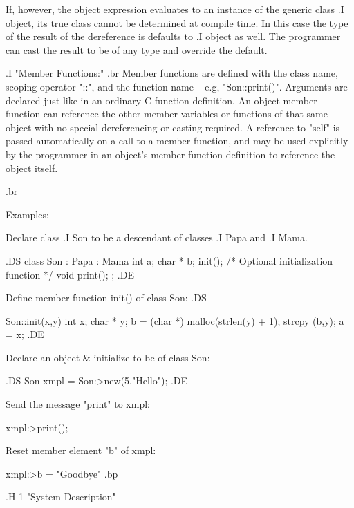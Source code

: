 If, however, the object expression evaluates to an instance of the
generic class
.I object,
its true class cannot be determined at compile time.  In this
case the type of the result of the dereference is defaults to
.I object
as well.  The programmer can cast the result to be of
any type and override the default.

.I "Member Functions:"
.br
Member functions are defined with the class name, scoping operator "::", and the
function name -- e.g, "Son::print()".   Arguments are declared just like in
an ordinary C function definition.  An object member function can reference
the other
member variables or functions
of that same object with no special dereferencing or casting
required.  A reference to "self" is passed automatically on a call to a
member function, and may be used explicitly by the programmer
in an object's member function definition to
reference the object itself.


.br

Examples:

Declare class
.I Son
to be a descendant of classes
.I Papa
and
.I Mama.

.DS
	class Son : Papa : Mama
		{ int a;
		  char * b;
		  init();	/* Optional initialization function */
		  void print();
		};
.DE

Define member function init() of class Son:
.DS

	Son::init(x,y)	int x; char * y;
	{ b = (char *) malloc(strlen(y) + 1);
	  strcpy (b,y);
	  a = x;
	}
.DE

Declare an object & initialize to be of class Son:

.DS
	Son xmpl = Son:>new(5,"Hello");
.DE

Send the message "print" to xmpl:

	xmpl:>print();

Reset member element "b" of xmpl:

	xmpl:>b = "Goodbye"
.bp

.H 1 "System Description"

